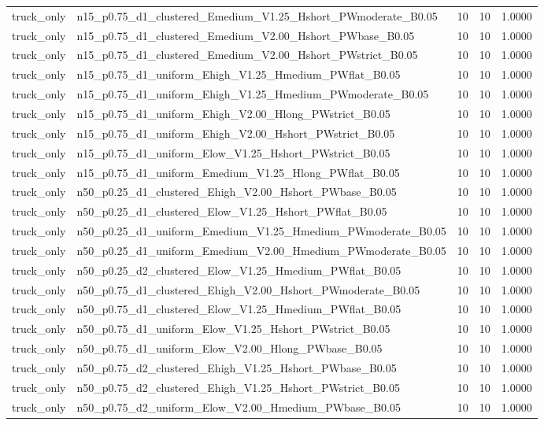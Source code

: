 \begin{tabular}{llrrr}
truck_only & n15_p0.75_d1_clustered_Emedium_V1.25_Hshort_PWmoderate_B0.05 & 10 & 10 & 1.0000 \\
truck_only & n15_p0.75_d1_clustered_Emedium_V2.00_Hshort_PWbase_B0.05 & 10 & 10 & 1.0000 \\
truck_only & n15_p0.75_d1_clustered_Emedium_V2.00_Hshort_PWstrict_B0.05 & 10 & 10 & 1.0000 \\
truck_only & n15_p0.75_d1_uniform_Ehigh_V1.25_Hmedium_PWflat_B0.05 & 10 & 10 & 1.0000 \\
truck_only & n15_p0.75_d1_uniform_Ehigh_V1.25_Hmedium_PWmoderate_B0.05 & 10 & 10 & 1.0000 \\
truck_only & n15_p0.75_d1_uniform_Ehigh_V2.00_Hlong_PWstrict_B0.05 & 10 & 10 & 1.0000 \\
truck_only & n15_p0.75_d1_uniform_Ehigh_V2.00_Hshort_PWstrict_B0.05 & 10 & 10 & 1.0000 \\
truck_only & n15_p0.75_d1_uniform_Elow_V1.25_Hshort_PWstrict_B0.05 & 10 & 10 & 1.0000 \\
truck_only & n15_p0.75_d1_uniform_Emedium_V1.25_Hlong_PWflat_B0.05 & 10 & 10 & 1.0000 \\
truck_only & n50_p0.25_d1_clustered_Ehigh_V2.00_Hshort_PWbase_B0.05 & 10 & 10 & 1.0000 \\
truck_only & n50_p0.25_d1_clustered_Elow_V1.25_Hshort_PWflat_B0.05 & 10 & 10 & 1.0000 \\
truck_only & n50_p0.25_d1_uniform_Emedium_V1.25_Hmedium_PWmoderate_B0.05 & 10 & 10 & 1.0000 \\
truck_only & n50_p0.25_d1_uniform_Emedium_V2.00_Hmedium_PWmoderate_B0.05 & 10 & 10 & 1.0000 \\
truck_only & n50_p0.25_d2_clustered_Elow_V1.25_Hmedium_PWflat_B0.05 & 10 & 10 & 1.0000 \\
truck_only & n50_p0.75_d1_clustered_Ehigh_V2.00_Hshort_PWmoderate_B0.05 & 10 & 10 & 1.0000 \\
truck_only & n50_p0.75_d1_clustered_Elow_V1.25_Hmedium_PWflat_B0.05 & 10 & 10 & 1.0000 \\
truck_only & n50_p0.75_d1_uniform_Elow_V1.25_Hshort_PWstrict_B0.05 & 10 & 10 & 1.0000 \\
truck_only & n50_p0.75_d1_uniform_Elow_V2.00_Hlong_PWbase_B0.05 & 10 & 10 & 1.0000 \\
truck_only & n50_p0.75_d2_clustered_Ehigh_V1.25_Hshort_PWbase_B0.05 & 10 & 10 & 1.0000 \\
truck_only & n50_p0.75_d2_clustered_Ehigh_V1.25_Hshort_PWstrict_B0.05 & 10 & 10 & 1.0000 \\
truck_only & n50_p0.75_d2_uniform_Elow_V2.00_Hmedium_PWbase_B0.05 & 10 & 10 & 1.0000 \\
\bottomrule
\end{tabular}
